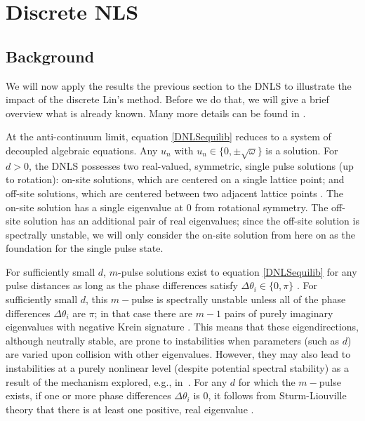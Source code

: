 \documentclass[12pt]{elsarticle}
\begin{document}
\section{Discrete NLS}\label{sec:DNLS}

\subsection{Background}

We will now apply the results the previous section to the 
DNLS to illustrate the impact of the discrete Lin's method. Before we do that, we will give a brief overview what is already known. Many more details can be found in \cite{Kevrekidis2009,pelinovsky_2011}. 

At the anti-continuum limit, equation \eqref{DNLSequilib} reduces to a system of decoupled algebraic equations. Any $u_n$ with $u_n \in \{ 0, \pm \sqrt{\omega}\}$ is a solution. For $d > 0$, the DNLS possesses two real-valued, symmetric, single pulse solutions (up to rotation): on-site solutions, which are centered on a single lattice point; and off-site solutions, which are centered between two adjacent lattice points \cite{Kevrekidis2009}. The on-site solution has a single eigenvalue at 0 from rotational symmetry. The off-site solution has an additional pair of real eigenvalues; since the off-site solution is spectrally unstable, we will only consider the on-site solution from here on as the foundation for the 
single pulse state. 

For sufficiently small $d$, $m$-pulse solutions exist to equation \eqref{DNLSequilib} for any pulse distances as long as the phase differences satisfy $\Delta \theta_i \in \{0, \pi\}$ \cite[Proposition 2.1]{Pelinovsky2005}. For sufficiently small $d$, this $m-$pulse is spectrally unstable unless all of the phase differences $\Delta \theta_i$ are $\pi$; in that case there are $m-1$ pairs of purely imaginary eigenvalues with negative Krein signature \cite[Theorem 3.6]{Pelinovsky2005}.
This means that these eigendirections, although neutrally
stable, are prone to instabilities when parameters 
(such as $d$) are varied upon collision with other
eigenvalues. However, they may also lead to instabilities
at a purely nonlinear level (despite potential spectral
stability) as a result of the mechanism explored, e.g.,
in~\cite{CUCCAGNA200938,PRL_2015}.
For any $d$ for which the $m-$pulse exists, if one or more phase differences $\Delta \theta_i$ is 0, it follows from Sturm-Liouville theory that there is at least one positive, real eigenvalue \cite{Kapitula2001a}.
\end{document}
